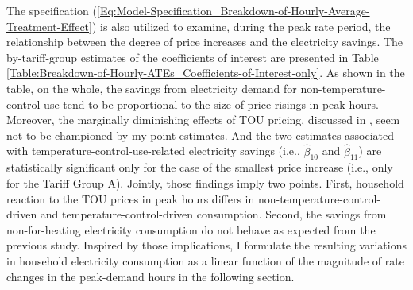The specification (\ref{Eq:Model-Specification_Breakdown-of-Hourly-Average-Treatment-Effect}) is also utilized to examine, during the peak rate period, the relationship between the degree of price increases and the electricity savings. The by-tariff-group estimates of the coefficients of interest are presented in Table \ref{Table:Breakdown-of-Hourly-ATEs_Coefficients-of-Interest-only}. As shown in the table, on the whole, the savings from electricity demand for non-temperature-control use tend to be proportional to the size of price risings in peak hours. Moreover, the marginally diminishing effects of TOU pricing, discussed in \cite{Peaking-Interest:How-Awareness-Drives-the-Effectiveness-of-Time-of-Use-Electricity-Pricing_Prest_2020}, seem not to be championed by my point estimates. And the two estimates associated with temperature-control-use-related electricity savings (i.e., $\hat{\beta}_{10}$ and $\hat{\beta}_{11}$) are statistically significant only for the case of the smallest price increase (i.e., only for the Tariff Group A). Jointly, those findings imply two points. First, household reaction to the TOU prices in peak hours differs in non-temperature-control-driven and temperature-control-driven consumption. Second, the savings from non-for-heating electricity consumption do not behave as expected from the previous study. Inspired by those implications, I formulate the resulting variations in household electricity consumption as a linear function of the magnitude of rate changes in the peak-demand hours in the following section.
